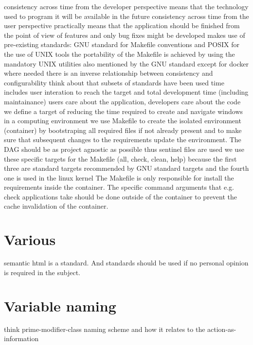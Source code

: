 \documentclass[journal]{IEEEtran}
\begin{document}
consistency across time from the developer perspective means that the technology used to program it will be available in the future
consistency across time from the user perspective practically means that the application should be finished from the point of view of features and only bug fixes might be developed
makes use of pre-existing standards: GNU standard for Makefile conventions and POSIX for the use of UNIX tools
the portability of the Makefile is achieved by using the mandatory UNIX utilities also mentioned by the GNU standard except for docker where needed
there is an inverse relationship between consistency and configurability
think about that subsets of standards have been used
time includes user interation to reach the target and total development time (including maintainance)
users care about the application, developers care about the code
we define a target of reducing the time required to create and navigate windows in a computing environment
we use Makefile to create the isolated environment (container) by bootstraping all required files if not already present and to make sure that subsequent changes to the requirements update the environment. The DAG should be as project agnostic as possible thus sentinel files are used
we use these specific targets for the Makefile (all, check, clean, help) because the first three are standard targets recommended by GNU standard targets and the fourth one is used in the linux kernel
The Makefile is only responsible for install the requirements inside the container.
The specific command arguments that e.g. check applications take should be done outside of the container to prevent the cache invalidation of the container.

\section{Various}
semantic html is a standard. And standards should be used if no personal opinion is required in the subject.

\section{Variable naming}
think prime-modifier-class naming scheme and how it relates to the action-as-information
\end{document}
